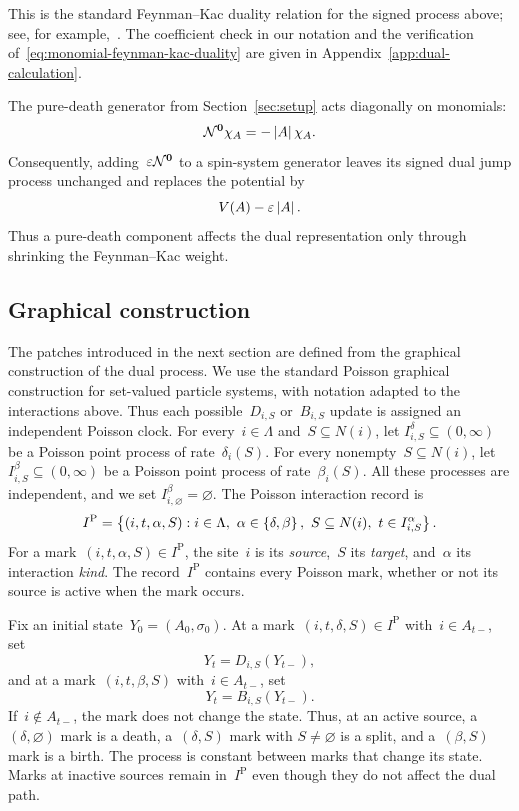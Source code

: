 This is the standard Feynman--Kac duality relation for the signed process above;
see, for example,~\cite{JansenKurt2014}. The coefficient check in our notation
and the verification of~\eqref{eq:monomial-feynman-kac-duality} are given in
Appendix~\ref{app:dual-calculation}.

The pure-death generator from Section~\ref{sec:setup} acts diagonally on
monomials:
\begin{equation*}
\mathcal{N}^{\mathbf{0}}\chi_A=-\left|A\right|\chi_A.
\end{equation*}
Consequently, adding~$\varepsilon\mathcal{N}^{\mathbf{0}}$ to a spin-system generator
leaves its signed dual jump process unchanged and replaces the potential by
\begin{equation*}
V(A)-\varepsilon\left|A\right|.
\end{equation*}
Thus a pure-death component affects the dual representation only through shrinking the
Feynman--Kac weight.

\subsection{Graphical construction}
\label{subsec:dual-graphical-construction}

The patches introduced in the next section are defined from the graphical
construction of the dual process. We use the standard Poisson graphical construction for set-valued
particle systems, with notation adapted to the interactions above. Thus each
possible~$D_{i,S}$ or~$B_{i,S}$ update is assigned an independent Poisson
clock. For every~$i\in\Lambda$ and~$S\subseteq N(i)$, let
$I_{i,S}^\delta\subseteq(0,\infty)$ be a Poisson point process of
rate~$\delta_i(S)$. For every nonempty~$S\subseteq N(i)$, let
$I_{i,S}^\beta\subseteq(0,\infty)$ be a Poisson point process of
rate~$\beta_i(S)$. All these processes are independent, and we set
$I_{i,\varnothing}^\beta=\varnothing$. The Poisson interaction record is
\begin{equation*}
I^{\mathrm P}
=
\left\{(i,t,\alpha,S):i\in\Lambda,\ \alpha\in\left\{\delta,\beta\right\},\
S\subseteq N(i),\ t\in I_{i,S}^\alpha\right\}.
\end{equation*}
For a mark~$(i,t,\alpha,S)\in I^{\mathrm P}$, the site~$i$ is its
\emph{source},~$S$ its \emph{target}, and~$\alpha$ its interaction \emph{kind}. The
record~$I^{\mathrm P}$ contains every Poisson mark, whether or not its source is
active when the mark occurs.

Fix an initial state~$Y_0=(A_0,\sigma_0)$. At a
mark~$(i,t,\delta,S)\in I^{\mathrm P}$ with~$i\in A_{t-}$, set
\begin{equation*}
Y_t=D_{i,S}(Y_{t-}),
\end{equation*}
and at a mark~$(i,t,\beta,S)$ with~$i\in A_{t-}$, set
\begin{equation*}
Y_t=B_{i,S}(Y_{t-}).
\end{equation*}
If~$i\notin A_{t-}$, the mark does not change the state. Thus, at an active
source, a~$(\delta,\varnothing)$ mark is a death, a~$(\delta,S)$ mark with
$S\neq\varnothing$ is a split, and a~$(\beta,S)$ mark is a birth. The process
is constant between marks that change its state. Marks at inactive sources
remain in~$I^{\mathrm P}$ even though they do not affect the dual path.

